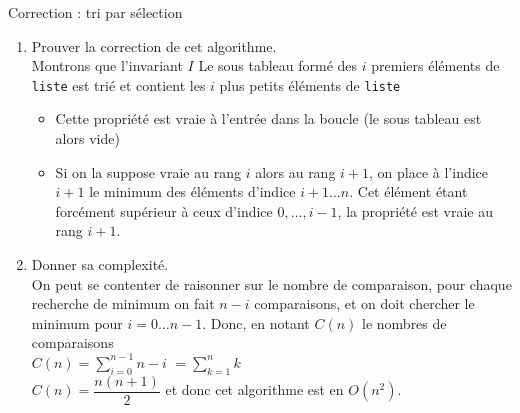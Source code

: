 \documentclass[10pt]{beamer}
\begin{document}
\begin{frame}[fragile]{\Ctitle}{\stitle}
	\begin{exampleblock}{Correction : tri par sélection}
		\begin{enumerate}
			\addtocounter{enumi}{2}
			\item<1-> Prouver la correction de cet algorithme.\\
				\onslide<2->\textcolor{OliveGreen}{\small Montrons que l'invariant $I$ \og{} Le sous tableau formé des $i$ premiers éléments de {\tt liste} est trié et contient les $i$ plus petits éléments de {\tt liste} \fg{}}
				\begin{itemize}
					\item<3-> \textcolor{OliveGreen}{Cette propriété est vraie à l'entrée dans la boucle (le sous tableau est alors vide)}
					\item<4-> \textcolor{OliveGreen}{Si on la suppose vraie au rang $i$ alors au rang $i+1$, on place à l'indice $i+1$ le minimum des éléments d'indice $i+1 \dots n$. Cet élément étant forcément supérieur à ceux d'indice $0,\dots, i-1$, la propriété est vraie au rang $i+1$.}
				\end{itemize}
			\item<5-> Donner sa complexité. \\
				\onslide<6->\textcolor{OliveGreen}{\small On peut se contenter de raisonner sur le nombre de comparaison, pour chaque recherche de minimum on fait $n-i$ comparaisons, et on doit chercher le minimum pour $i=0 \dots n-1$. Donc, en notant $C(n)$ le nombres de comparaisons \\}
				\onslide<7->\textcolor{OliveGreen}{$C(n)=\displaystyle{\sum_{i=0}^{n-1} n-i}$}
				\onslide<8->\textcolor{OliveGreen}{$=\displaystyle{\sum_{k=1}^{n} k}$\\}
				\onslide<9->\textcolor{OliveGreen}{$C(n)=\dfrac{n(n+1)}{2}$ et donc cet algorithme est en $O(n^2)$.}
		\end{enumerate}
	\end{exampleblock}
\end{frame}
\end{document}
